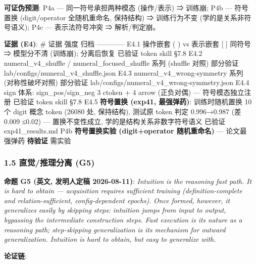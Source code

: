 \documentclass[
]{article}
\begin{document}
\textbf{可证伪预测}: P4a --- 同一符号承担两种模态 (操作/表示) ⇒ 训练崩;
P4b --- 符号置换 (digit/operator 全随机重命名, 保持结构) ⇒ 训练行为不变
(学的是关系非符号语义); P4c --- 表示法符号冲突 ⇒ 解析/判定崩。

\textbf{证据 (E4)}: \textbar{} \# \textbar{} 证据 \textbar{} 强度
\textbar{} 归档 \textbar{}
\textbar---\textbar---\textbar---\textbar---\textbar{} \textbar{} E4.1
\textbar{} 操作嵌套 ( ) vs 表示嵌套 {[} {]} 同符号 ⇒ 模型分不清
(训练崩); 分离后恢复 \textbar{} 已验证 \textbar{} token skill §7.8
\textbar{} \textbar{} E4.2 \textbar{} numeral\_v4\_shuffle /
numeral\_focused\_shuffle 系列 (shuffle 对照) \textbar{} 部分验证
\textbar{} lab/configs/numeral\_v4\_shuffle.json \textbar{} \textbar{}
E4.3 \textbar{} numeral\_v4\_wrong-symmetry 系列 (对称性破坏对照)
\textbar{} 部分验证 \textbar{}
lab/configs/numeral\_v4\_wrong-symmetry.json \textbar{} \textbar{} E4.4
\textbar{} sign 体系: sign\_pos/sign\_neg 3 ctoken + 4 arrow (正负对偶)
--- 符号模态独立注册 \textbar{} 已验证 \textbar{} token skill §7.8
\textbar{} \textbar{} E4.5 \textbar{} \textbf{符号置换 (exp41,
最强弹药)}: 训练时随机置换 10 个 digit 概念 token (26080 处, 保持结构),
测试原 token 判定 0.996→0.987 (差 0.009 ≤0.02) --- 置换不变性成立,
学的是结构关系非数字符号语义 \textbar{} 已验证 \textbar{}
exp41\_results.md \textbar{} \textbar{} P4b \textbar{}
\textbf{符号置换实验 (digit+operator 随机重命名)} --- 论文最强弹药
\textbar{} \textbf{待验证} \textbar{} 需实验 \textbar{}

\subsubsection{1.5 直觉/推理分离
(G5)}\label{ux76f4ux89c9ux63a8ux7406ux5206ux79bb-g5}

\textbf{命题 G5 (英文, 发明人定稿 2026-08-11)}: \emph{Intuition is the
reasoning fast path. It is hard to obtain --- acquisition requires
sufficient training (definition-complete and relation-sufficient,
config-dependent epochs). Once formed, however, it generalizes easily by
skipping steps: intuition jumps from input to output, bypassing the
intermediate construction steps. Fast execution is its nature as a
reasoning path; step-skipping generalization is its mechanism for
outward generalization. Intuition is hard to obtain, but easy to
generalize with.}

\textbf{论证链}:
\end{document}

